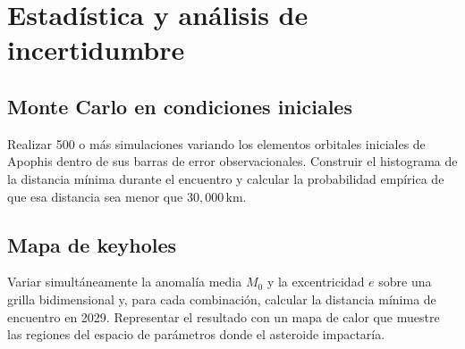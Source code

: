 \section{Estadística y análisis de incertidumbre}

\subsection{Monte Carlo en condiciones iniciales}

Realizar 500 o más simulaciones variando los elementos orbitales iniciales de Apophis dentro de sus barras de error observacionales. Construir el histograma de la distancia mínima durante el encuentro y calcular la probabilidad empírica de que esa distancia sea menor que $30{,}000\,\mathrm{km}$.

\subsection{Mapa de keyholes}

Variar simultáneamente la anomalía media $M_0$ y la excentricidad $e$ sobre una grilla bidimensional y, para cada combinación, calcular la distancia mínima de encuentro en 2029. Representar el resultado con un mapa de calor que muestre las regiones del espacio de parámetros donde el asteroide impactaría.